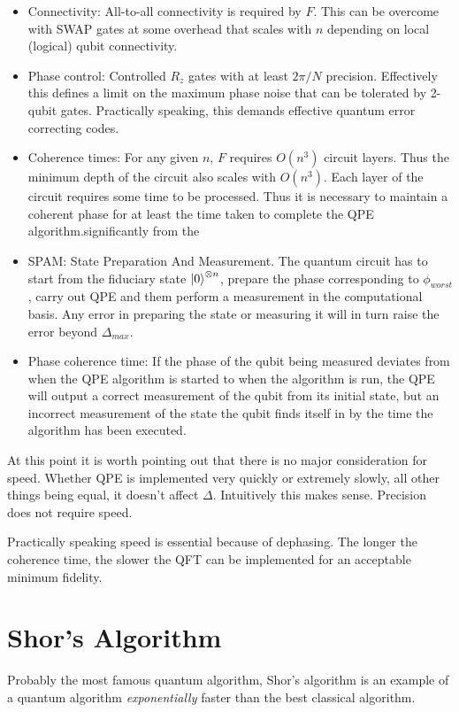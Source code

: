 \documentclass{book}
\begin{document}
\begin{itemize}
   \item Connectivity: All-to-all connectivity is required by $F$. This can be overcome with SWAP gates at some overhead that scales with $n$ depending on local (logical) qubit connectivity.
   \item Phase control: Controlled $R_z$ gates with at least $2\pi/N$ precision. Effectively this defines a limit on the maximum phase noise that can be tolerated by 2-qubit gates. Practically speaking, this demands effective quantum error correcting codes.
   \item Coherence times: For any given $n$, $F$ requires $O(n^3)$ circuit layers. Thus the minimum depth of the circuit also scales with $O(n^3)$. Each layer of the circuit requires some time to be processed. Thus it is necessary to maintain a coherent phase for at least the time taken to complete the QPE algorithm.significantly from the  
   \item SPAM: State Preparation And Measurement. The quantum circuit has to start from the fiduciary state $\ket{0}^{\otimes n}$, prepare the phase corresponding to $\phi_{worst}$, carry out QPE and them perform a measurement in the computational basis. Any error in preparing the state or measuring it will in turn raise the error beyond $\Delta_{max}$.
   \item Phase coherence time: If the phase of the qubit being measured deviates from when the QPE algorithm is started to when the algorithm is run, the QPE will output a correct measurement of the qubit from its initial state, but an incorrect measurement of the state the qubit finds itself in by the time the algorithm has been executed. 
\end{itemize}

At this point it is worth pointing out that there is no major consideration for speed. Whether QPE is implemented very quickly or extremely slowly, all other things being equal, it doesn't affect $\Delta $. Intuitively this makes sense. Precision does not require speed. 

Practically speaking speed is essential because of dephasing. The longer the coherence time, the slower the QFT can be implemented for an acceptable minimum fidelity. 

\chapter{Shor's Algorithm}

Probably the most famous quantum algorithm, Shor's algorithm is an example of a quantum algorithm \textit{exponentially} faster than the best classical algorithm. 
\end{document}
